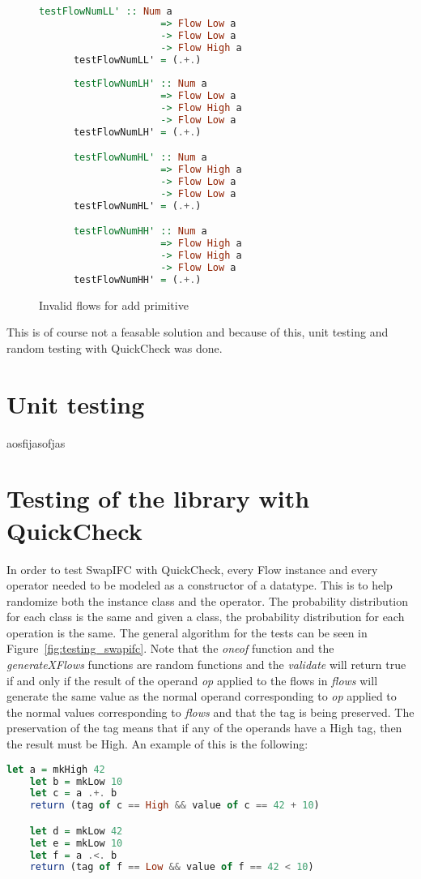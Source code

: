 \begin{figure}[h]
  \begin{center}
    \begin{lstlisting}[language=Haskell]
      testFlowNumLL' :: Num a
                     => Flow Low a
                     -> Flow Low a
                     -> Flow High a
      testFlowNumLL' = (.+.)
    
      testFlowNumLH' :: Num a
                     => Flow Low a
                     -> Flow High a
                     -> Flow Low a
      testFlowNumLH' = (.+.)

      testFlowNumHL' :: Num a
                     => Flow High a
                     -> Flow Low a
                     -> Flow Low a
      testFlowNumHL' = (.+.)

      testFlowNumHH' :: Num a
                     => Flow High a
                     -> Flow High a
                     -> Flow Low a
      testFlowNumHH' = (.+.)
    \end{lstlisting}
  \end{center}
  \caption{Invalid flows for add primitive}
  \label{fig:invalidFlow}
\end{figure}
This is of course not a feasable solution and because of this, unit testing and random testing with QuickCheck was done.
\section{Unit testing}
aosfijasofjas
\section{Testing of the library with QuickCheck}
In order to test SwapIFC with QuickCheck, every Flow instance and every operator needed to be modeled as a constructor of a datatype. This is to help randomize both the instance class and the operator. The probability distribution for each class is the same and given a class, the probability distribution for each operation is the same. The general algorithm for the tests can be seen in Figure~\ref{fig:testing_swapifc}. Note that the \emph{oneof} function and the \emph{generateXFlows} functions are random functions and the \emph{validate} will return true if and only if the result of the operand \emph{op} applied to the flows in \emph{flows} will generate the same value as the normal operand corresponding to \emph{op} applied to the normal values corresponding to \emph{flows} and that the tag is being preserved. The preservation of the tag means that if any of the operands have a High tag, then the result must be High. An example of this is the following:
\begin{center}
  \begin{lstlisting}[language=Haskell]
    let a = mkHigh 42
    let b = mkLow 10
    let c = a .+. b
    return (tag of c == High && value of c == 42 + 10)

    let d = mkLow 42
    let e = mkLow 10
    let f = a .<. b
    return (tag of f == Low && value of f == 42 < 10)
  \end{lstlisting}
\end{center}

